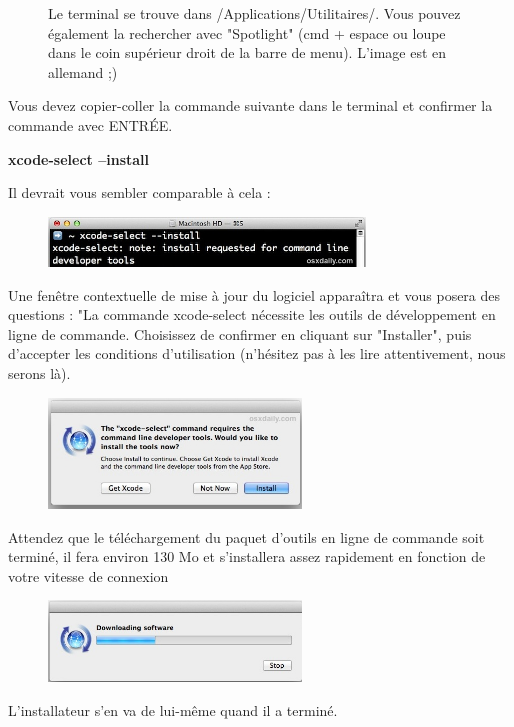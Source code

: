 \documentclass{article}
\begin{document}
\begin{figure}[H]
\begin{subfigure}[c]{0.5\textwidth}
\end{subfigure}
\caption{Le terminal se trouve dans /Applications/Utilitaires/. Vous pouvez également la rechercher avec "Spotlight" (cmd + espace ou loupe dans le coin supérieur droit de la barre de menu). L'image est en allemand ;) \label{F:HowToFindTerminal}}
\end{figure}



Vous devez copier-coller la commande suivante dans le terminal et confirmer la commande avec ENTRÉE.
\begin{tcolorbox}[width=\textwidth,colframe=Bittersweet,colback={black},title={Ceci est le terminal},outer arc=0mm,colupper=white]    
      \large\textbf{xcode-select --install}
\end{tcolorbox}
Il devrait vous sembler comparable à cela :
\begin{figure}[H]
\center
\includegraphics[width=0.75\textwidth]{Plots/install-command-line-tools-os-x.jpg}
\end{figure}

Une fenêtre contextuelle de mise à jour du logiciel apparaîtra et vous posera des questions : "La commande xcode-select nécessite les outils de développement en ligne de commande. Choisissez de confirmer en cliquant sur "Installer", puis d'accepter les conditions d'utilisation (n'hésitez pas à les lire attentivement, nous serons là).
\begin{figure}[H]
\center
\includegraphics[width=0.6\textwidth]{Plots/confirm-install-command-line-tools-mac-os-x.jpg}
\end{figure}
Attendez que le téléchargement du paquet d'outils en ligne de commande soit terminé, il fera environ 130 Mo et s'installera assez rapidement en fonction de votre vitesse de connexion
\begin{figure}[H]
\center
\includegraphics[width=0.6\textwidth]{Plots/downloading-command-line-tools.jpg}
\end{figure}
L'installateur s'en va de lui-même quand il a terminé.
\end{document}
